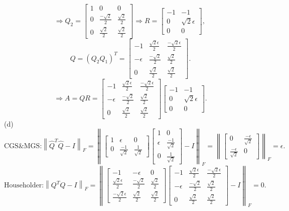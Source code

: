 \documentclass{article}
\begin{document}
\[\Rightarrow Q_2=\begin{bmatrix}1&0&0\\0&\frac{-\sqrt2}{2}&\frac{\sqrt2}{2}\\0&\frac{\sqrt2}{2}&\frac{\sqrt2}{2}\end{bmatrix}\Rightarrow R=\begin{bmatrix}-1&-1\\0&\sqrt2\epsilon\\0&0\end{bmatrix},\,\]\[Q=(Q_2Q_1)^T=\begin{bmatrix}-1&\frac{\sqrt2\epsilon}{2}&\frac{-\sqrt2\epsilon}{2}\\-\epsilon&\frac{-\sqrt2}{2}&\frac{\sqrt2}{2}\\0&\frac{\sqrt2}{2}&\frac{\sqrt2}{2}\end{bmatrix}.\]
\[\Rightarrow A=QR=\begin{bmatrix}-1&\frac{\sqrt2\epsilon}{2}&\frac{-\sqrt2\epsilon}{2}\\-\epsilon&\frac{-\sqrt2}{2}&\frac{\sqrt2}{2}\\0&\frac{\sqrt2}{2}&\frac{\sqrt2}{2}\end{bmatrix}\begin{bmatrix}-1&-1\\0&\sqrt2\epsilon\\0&0\end{bmatrix}.\]
(d)\[\text{CGS\&MGS:}\left\lVert\hat{Q}^T\hat{Q}-I\right\rVert_F=\left\lVert\begin{bmatrix}1&\epsilon&0\\0&\frac{-1}{\sqrt2}&\frac{1}{\sqrt2}\end{bmatrix}\begin{bmatrix}1&0\\\epsilon&\frac{-1}{\sqrt2}\\0&\frac{1}{\sqrt2}\end{bmatrix}-I\right\rVert_F=\left\lVert\begin{bmatrix}0&\frac{-\epsilon}{\sqrt2}\\\frac{-\epsilon}{\sqrt2}&0\end{bmatrix}\right\rVert_F=\epsilon.\]
\[\text{Householder:}\left\lVert Q^TQ-I\right\rVert_F=\left\lVert\begin{bmatrix}-1&-\epsilon&0\\\frac{\sqrt2\epsilon}{2}&\frac{-\sqrt2}{2}&\frac{\sqrt2}{2}\\\frac{-\sqrt2\epsilon}{2}&\frac{\sqrt2}{2}&\frac{\sqrt2}{2}\end{bmatrix}\begin{bmatrix}-1&\frac{\sqrt2\epsilon}{2}&\frac{-\sqrt2\epsilon}{2}\\-\epsilon&\frac{-\sqrt2}{2}&\frac{\sqrt2}{2}\\0&\frac{\sqrt2}{2}&\frac{\sqrt2}{2}\end{bmatrix}-I \right\rVert_F=0.\]
\end{document}
